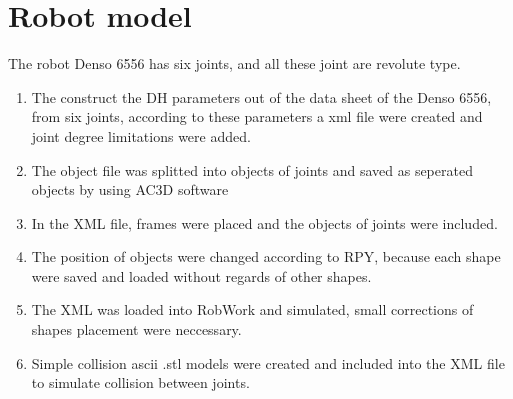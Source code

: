 \section{Robot model}
\label{sec:program}

The robot Denso 6556 has six joints, and all these joint are revolute type. 

\begin{enumerate}
	\item The  construct the DH parameters out of the data sheet of the Denso 6556, from six joints, according to these parameters a xml file were created and joint degree limitations were added. \\
	\item  The object file was splitted into objects of joints and saved as seperated objects by using AC3D software \\
	\item  In the XML file, frames were placed and the objects of joints were included. \\
	\item The position of objects were changed according to RPY, because each shape were saved and loaded without regards of other shapes. \\
	\item The XML was loaded into RobWork and simulated, small corrections of shapes placement were neccessary. \\
	\item Simple collision ascii .stl models were created and included into the XML file to simulate collision between joints. \\
\end{enumerate}
